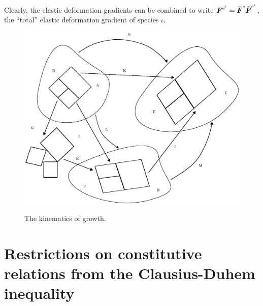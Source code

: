 \noindent Clearly, the elastic deformation gradients can be
combined to write $\mbox{\boldmath$ F$}^{\mathrm{e}^\iota} =
\bar{\mbox{\boldmath$ F$}}^\mathrm{e}\tilde{\mbox{\boldmath$ F$}}^{\mathrm{e}^\iota}$, the ``total''
elastic deformation gradient of species $\iota$.
\begin{figure}[ht]
 
 
 
   
    \centering
{\includegraphics[width=15cm]{images/kinematics.eps}} \caption{The
kinematics of growth.} \label{growthkinematicsfig}
\end{figure}

\section{Restrictions on constitutive relations from the
Clausius-Duhem inequality} \label{sect5}

